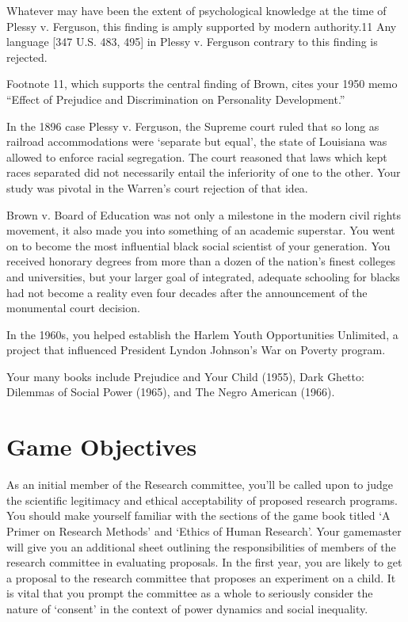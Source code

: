 Whatever may have been the extent of psychological knowledge at the time of Plessy v. Ferguson, this finding is amply supported by modern authority.11 Any language [347 U.S. 483, 495] in Plessy v. Ferguson contrary to this finding is rejected.

Footnote 11, which supports the central finding of Brown, cites your 1950 memo ``Effect of Prejudice and Discrimination on Personality Development.''

In the 1896 case Plessy v. Ferguson, the Supreme court ruled that so long as railroad accommodations were `separate but equal', the state of Louisiana was allowed to enforce racial segregation. The court reasoned that laws which kept races separated did not necessarily entail the inferiority of one to the other. Your study was pivotal in the Warren's court rejection of that idea.

Brown v. Board of Education was not only a milestone in the modern civil rights movement, it also made you into something of an academic superstar. You went on to become the most influential black social scientist of your generation. You received honorary degrees from more than a dozen of the nation's finest colleges and universities, but your larger goal of integrated, adequate schooling for blacks had not become a reality even four decades after the announcement of the monumental court decision.

In the 1960s, you helped establish the Harlem Youth Opportunities Unlimited, a project that influenced President Lyndon Johnson's War on Poverty program.

Your many books include Prejudice and Your Child (1955), Dark Ghetto: Dilemmas of Social Power (1965), and The Negro American (1966). 

\section{Game Objectives}
\label{gameobjectives}

As an initial member of the Research committee, you'll be called upon to judge the scientific legitimacy and ethical acceptability of proposed research programs. You should make yourself familiar with the sections of the game book titled `A Primer on Research Methods' and `Ethics of Human Research'. Your gamemaster will give you an additional sheet outlining the responsibilities of members of the research committee in evaluating proposals. In the first year, you are likely to get a proposal to the research committee that proposes an experiment on a child. It is vital that you prompt the committee as a whole to seriously consider the nature of `consent' in the context of power dynamics and social inequality.

